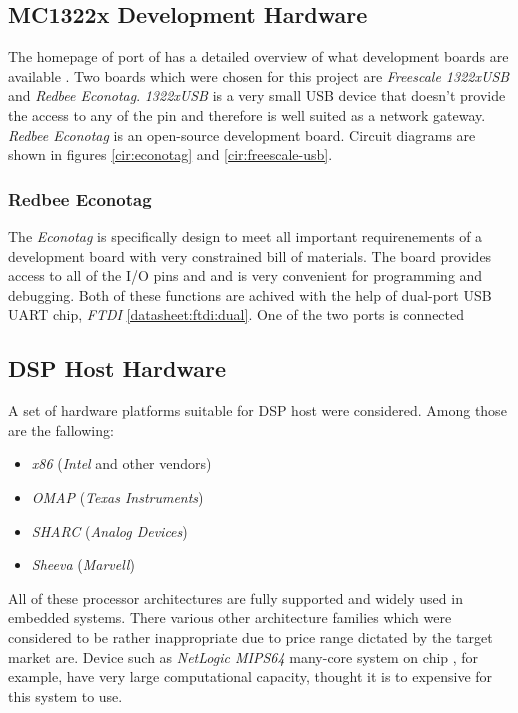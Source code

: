 {{%

\subsection{MC1322x Development Hardware}

  The homepage of  port of \contiki has a detailed
 overview of what development boards are available \cite{homepage:mc1322x:hw}.
 Two boards which were chosen for this project are \emph{Freescale
 1322xUSB} and \emph{Redbee Econotag}.
 \emph{1322xUSB} is a very small USB device that doesn't provide the
 access to any of the pin and therefore is well suited as a network
 gateway. \emph{Redbee Econotag} is an open-source development board.
  Circuit diagrams are shown in figures \ref{cir:econotag} and 
 \ref{cir:freescale-usb}.

\subsubsection{Redbee Econotag}

  The \emph{Econotag} is specifically design to meet all important
 requirenements of a development board with very constrained bill of
 materials. The board provides access to all of the I/O pins and
 and is very convenient for programming and debugging. Both of these
 functions are achived with the help of dual-port USB UART chip,
 \emph{FTDI}  \ref{datasheet:ftdi:dual}. One of the two
 ports is connected 

 



\subsection{DSP Host Hardware}

  A set of hardware platforms suitable for DSP host were considered.
 Among those are the fallowing:
 	\begin{itemize}
		\item \emph{x86} (\emph{Intel} and other vendors)
		\item \emph{OMAP} (\emph{Texas Instruments})
		\item \emph{SHARC} (\emph{Analog Devices})
		\item \emph{Sheeva} (\emph{Marvell})
	\end{itemize}
 All of these processor architectures are fully supported and widely
 used in embedded systems. There various other architecture families
 which were considered to be rather inappropriate due to price range
 dictated by the target market are. Device such as \emph{NetLogic
 MIPS64} many-core system on chip \cite{netlogic:mips64:multicore},
 for example, have very large computational capacity, thought it is
 to expensive for this system to use.

}}
